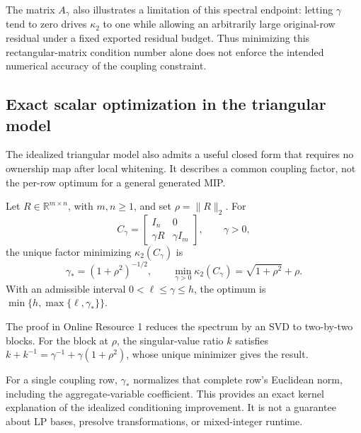 The matrix $A_\gamma$ also illustrates a limitation of this spectral endpoint:
letting $\gamma$ tend to zero drives $\kappa_2$ to one while allowing an
arbitrarily large original-row residual under a fixed exported residual budget.
Thus minimizing this rectangular-matrix condition number alone does not enforce
the intended numerical accuracy of the coupling constraint.

\subsection{Exact scalar optimization in the triangular model}

The idealized triangular model also admits a useful closed form that requires
no ownership map after local whitening. It describes a common coupling factor,
not the per-row optimum for a general generated MIP.

\begin{auditproposition}
\label{prop:audit-triangular-optimum}
Let $R\in\mathbb R^{m\times n}$, with $m,n\geq1$, and set $\rho=\|R\|_2$. For
\[
 C_\gamma=\begin{bmatrix}I_n&0\\\gamma R&\gamma I_m\end{bmatrix},
 \qquad\gamma>0,
\]
the unique factor minimizing $\kappa_2(C_\gamma)$ is
\[
 \gamma_*=(1+\rho^2)^{-1/2},
 \qquad
 \min_{\gamma>0}\kappa_2(C_\gamma)=\sqrt{1+\rho^2}+\rho.
\]
With an admissible interval $0<\ell\leq\gamma\leq h$, the optimum is
$\min\{h,\max\{\ell,\gamma_*\}\}$.
\end{auditproposition}
The proof in Online Resource 1 reduces the spectrum by an SVD to two-by-two
blocks. For the block at $\rho$, the singular-value ratio $k$ satisfies
$k+k^{-1}=\gamma^{-1}+\gamma(1+\rho^2)$, whose unique minimizer gives the result.


For a single coupling row, $\gamma_*$ normalizes that complete row's Euclidean
norm, including the aggregate-variable coefficient. This provides an exact
kernel explanation of the idealized conditioning improvement. It is not a
guarantee about LP bases, presolve transformations, or mixed-integer runtime.
